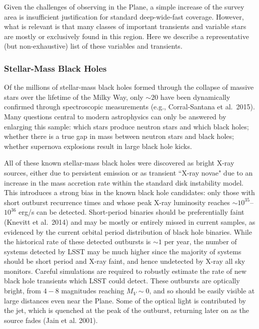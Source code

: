 Given the challenges of observing in the Plane, a simple increase of the survey area is insufficient justification for standard deep-wide-fast coverage. 
However, what is relevant is that many classes of important transients and variable stars are mostly or exclusively found in this region. Here we describe a 
representative (but non-exhaustive) list of these variables and transients.


\subsubsection{Stellar-Mass Black Holes}

Of the millions of stellar-mass black holes formed through the collapse of massive stars over the lifetime of the Milky Way, only $\sim 20$ have been 
dynamically confirmed through spectroscopic measurements (e.g., Corral-Santana et al.~2015). Many questions central to modern astrophysics can only be answered by enlarging this sample: which 
stars produce neutron stars and which black holes; whether there is a true gap in mass between neutron stars and black holes; whether supernova explosions 
result in large black hole kicks.

All of these known stellar-mass black holes were discovered  as bright X-ray sources, either due to persistent emission or as transient ``X-ray novae" 
due to an increase in the mass accretion rate within the standard  disk instability model. This introduces a strong bias in the known black hole candidates:
only those with short outburst recurrence times and whose peak X-ray luminosity reaches $\sim 10^{35}$--$10^{36}$ erg/s can be detected. 
Short-period binaries should be preferentially faint (Knevitt et al.~2014) and may be mostly or entirely missed in current samples, as evidenced by the current orbital period distribution of black hole binaries. While the historical rate of these detected outbursts is $\sim 1$ per year, the number of systems detected by LSST may be much higher since the majority of systems should be short period and X-ray faint, and hence undetected by X-ray all sky monitors. Careful simulations are required to robustly estimate the rate of new black hole transients which LSST could detect.
These outbursts are optically bright, from $4-8$ magnitudes reaching $M_{V}\sim 0$, and so should be easily visible at large distances even near the Plane. Some of the optical light is contributed by the jet, which is quenched at the peak of the outburst, returning later on as the source fades (Jain et al. 2001). 

